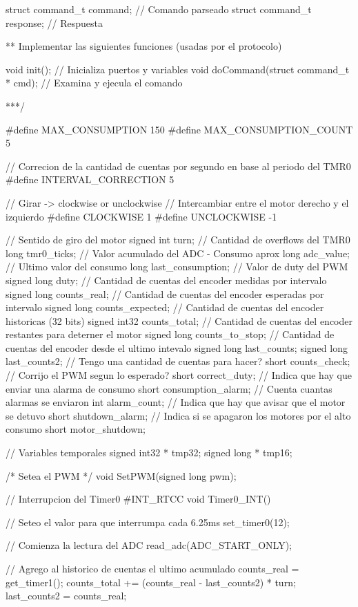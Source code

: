 {\begin{verbatimtab}
struct command_t command; 	// Comando parseado
struct command_t response; 	// Respuesta

** Implementar las siguientes funciones (usadas por el protocolo)

void init(); // Inicializa puertos y variables
void doCommand(struct command_t * cmd); // Examina y ejecula el comando

***/

#define MAX_CONSUMPTION	150
#define MAX_CONSUMPTION_COUNT	5

// Correcion de la cantidad de cuentas por segundo en base al periodo del TMR0
#define INTERVAL_CORRECTION	5

// Girar -> clockwise or unclockwise
// Intercambiar entre el motor derecho y el izquierdo
#define CLOCKWISE	1
#define UNCLOCKWISE	-1

// Sentido de giro del motor
signed int turn;
// Cantidad de overflows del TMR0
long tmr0_ticks;
// Valor acumulado del ADC - Consumo aprox
long adc_value;
// Ultimo valor del consumo
long last_consumption;
// Valor de duty del PWM
signed long duty;
// Cantidad de cuentas del encoder medidas por intervalo
signed long counts_real;
// Cantidad de cuentas del encoder esperadas por intervalo
signed long counts_expected;
// Cantidad de cuentas del encoder historicas (32 bits)
signed int32 counts_total;
// Cantidad de cuentas del encoder restantes para deterner el motor
signed long counts_to_stop;
// Cantidad de cuentas del encoder desde el ultimo intevalo
signed long last_counts;
signed long last_counts2;
// Tengo una cantidad de cuentas para hacer?
short counts_check;
// Corrijo el PWM segun lo esperado?
short correct_duty;
// Indica que hay que enviar una alarma de consumo
short consumption_alarm;
// Cuenta cuantas alarmas se enviaron
int alarm_count;
// Indica que hay que avisar que el motor se detuvo
short shutdown_alarm;
// Indica si se apagaron los motores por el alto consumo
short motor_shutdown;

// Variables temporales
signed int32 * tmp32;
signed long * tmp16;

/* Setea el PWM */
void SetPWM(signed long pwm);

// Interrupcion del Timer0
#INT_RTCC
void Timer0_INT()
{
	// Seteo el valor para que interrumpa cada 6.25ms
	set_timer0(12);
	
	// Comienza la lectura del ADC
	read_adc(ADC_START_ONLY);
	
	// Agrego al historico de cuentas el ultimo acumulado
	counts_real = get_timer1();
	counts_total += (counts_real - last_counts2) * turn;
	last_counts2 = counts_real;
	
}
\end{verbatimtab}}
